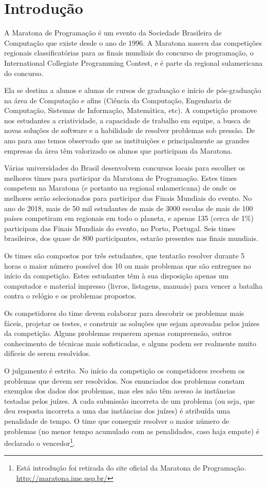 \newpage
\section{Introdução}
A Maratona de Programação é um evento da Sociedade Brasileira de Computação que existe desde o ano de 1996. A Maratona nasceu das competições regionais classificatórias para as finais mundiais do concurso de programação, o International Collegiate Programming Contest, e é parte da regional sulamericana do concurso.

Ela se destina a alunos e alunas de cursos de graduação e início de pós-graduação na área de Computação e afins (Ciência da Computação, Engenharia de Computação, Sistemas de Informação, Matemática, etc). A competição promove nos estudantes a criatividade, a capacidade de trabalho em equipe, a busca de novas soluções de software e a habilidade de resolver problemas sob pressão. De ano para ano temos observado que as instituições e principalmente as grandes empresas da área têm valorizado os alunos que participam da Maratona.

Várias universidades do Brasil desenvolvem concursos locais para escolher os melhores times para participar da Maratona de Programação. Estes times competem na Maratona (e portanto na regional sulamericana) de onde os melhores serão selecionados para participar das Finais Mundiais do evento. No ano de 2018, mais de 50 mil estudantes de mais de 3000 escolas de mais de 100 países competiram em regionais em todo o planeta, e apenas 135 (cerca de 1\%) participam das Finais Mundiais do evento, no Porto, Portugal. Seis times brasileiros, dos quase de 800 participantes, estarão presentes nas finais mundiais.

Os times são compostos por três estudantes, que tentarão resolver durante 5 horas o maior número possível dos 10 ou mais problemas que são entregues no início da competição. Estes estudantes têm à sua disposição apenas um computador e material impresso (livros, listagens, manuais) para vencer a batalha contra o relógio e os problemas propostos.

Os competidores do time devem colaborar para descobrir os problemas mais fáceis, projetar os testes, e construir as soluções que sejam aprovadas pelos juízes da competição. Alguns problemas requerem apenas compreensão, outros conhecimento de técnicas mais sofisticadas, e alguns podem ser realmente muito difíceis de serem resolvidos.

O julgamento é estrito. No início da competição os competidores recebem os problemas que devem ser resolvidos. Nos enunciados dos problemas constam exemplos dos dados dos problemas, mas eles não têm acesso às instâncias testadas pelos juízes. A cada submissão incorreta de um problema (ou seja, que deu resposta incorreta a uma das instâncias dos juízes) é atribuída uma penalidade de tempo. O time que conseguir resolver o maior número de problemas (no menor tempo acumulado com as penalidades, caso haja empate) é declarado o vencedor\footnote{Está introdução foi retirada do site oficial da Maratona de Programação. \url{http://maratona.ime.usp.br/}}. 

